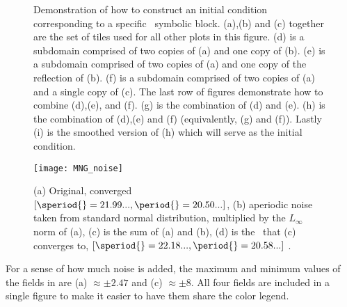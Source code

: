 \begin{figure}
\caption{ \label{fig:tilingschematic}
Demonstration of how to construct an initial condition corresponding to a specific
\spt\ symbolic block. (a),(b) and (c) together are the set of tiles used for all
other plots in this figure. (d) is a subdomain comprised of two copies of (a) and one copy of (b). (e) is a subdomain comprised of two copies of (a) and one copy of
the reflection of (b). (f) is a subdomain comprised of two copies of (a) and a
single copy of (c). The last row of figures demonstrate how to combine (d),(e),
and (f). (g) is the combination of (d) and (e). (h) is the combination of (d),(e)
and (f) (equivalently, (g) and (f)). Lastly (i) is the smoothed version of (h) which will serve as the initial condition.
}
\end{figure}

\begin{figure}
\begin{minipage}[height=.05\textheight]{\textwidth}
\centering
\texttt{[image: MNG\_noise]}
\end{minipage}
\caption{ \label{fig:MNGnoise}
(a) Original, converged \twot\ $[\speriod{}=21.99...,
\period{}=20.50...]$,
(b) aperiodic noise taken from standard normal distribution,
multiplied by
the $L_{\infty}$ norm of (a), (c) is the sum of (a) and (b),
(d) is the
\twot\ that (c) converges to, $[\speriod{}=22.18...,
\period{}=20.58...]$ .
}
\end{figure}

For a sense of how much noise is added, the maximum and
minimum values of
the fields in  are
(a) $\approx \pm 2.47$ and (c) $\approx \pm 8$. All four
fields are included
in a single figure to make it easier to have them share the
color legend. 